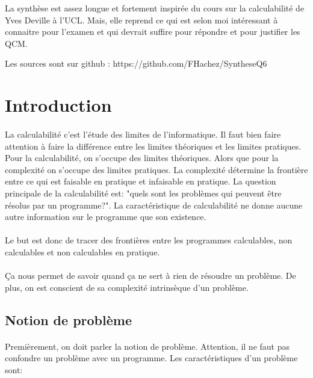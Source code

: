 \tableofcontents
\newpage

La synthèse est assez longue et fortement inspirée du cours sur la calculabilité
de Yves Deville à l'UCL. Mais, elle reprend ce qui est selon moi intéressant à connaitre
pour l'examen et qui devrait suffire pour répondre et pour justifier les QCM.

Les sources sont sur github : https://github.com/FHachez/SyntheseQ6

\section{Introduction}
\label{sec:introduction}

\paragraph{}
La calculabilité c'est l'étude des limites de l'informatique. Il faut bien 
faire attention à faire la différence entre les limites théoriques et les limites
pratiques. Pour la calculabilité, on s'occupe des limites théoriques.
Alors que pour la complexité on s'occupe des limites pratiques. La complexité
détermine la frontière entre ce qui est faisable en pratique et infaisable en pratique.
La question principale de la calculabilité est: "quels sont les problèmes qui peuvent
être résolus par un programme?". La caractéristique de calculabilité ne donne aucune autre information sur le programme que son existence.

\paragraph{} Le but est donc de tracer des frontières entre les programmes calculables,
non calculables et non calculables en pratique.

\paragraph{}
Ça nous permet de savoir quand ça ne sert à rien de résoudre un problème.
De plus, on est conscient de sa complexité intrinsèque d'un
problème.

\subsection{Notion de problème}
\label{subsec:notion_de_probl_me}

\paragraph{}
Premièrement, on doit parler la notion de problème.
Attention, il ne faut pas confondre un problème avec un programme.
Les caractéristiques d'un problème sont:


